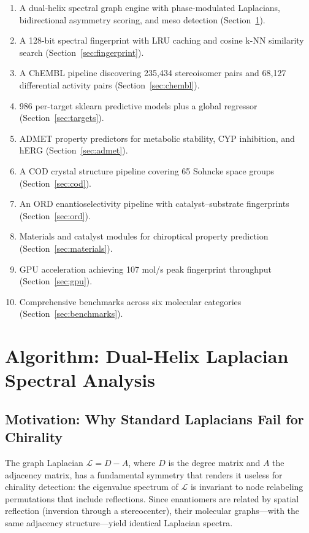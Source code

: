 \documentclass[11pt,a4paper]{article}
\begin{document}
\begin{enumerate}[leftmargin=1.5em]
  \item A dual-helix spectral graph engine with phase-modulated Laplacians,
    bidirectional asymmetry scoring, and meso detection (Section~\ref{sec:algorithm}).
  \item A 128-bit spectral fingerprint with LRU caching and cosine k-NN similarity
    search (Section~\ref{sec:fingerprint}).
  \item A ChEMBL pipeline discovering 235,434 stereoisomer pairs and 68,127
    differential activity pairs (Section~\ref{sec:chembl}).
  \item 986 per-target sklearn predictive models plus a global regressor
    (Section~\ref{sec:targets}).
  \item ADMET property predictors for metabolic stability, CYP inhibition,
    and hERG (Section~\ref{sec:admet}).
  \item A COD crystal structure pipeline covering 65 Sohncke space groups
    (Section~\ref{sec:cod}).
  \item An ORD enantioselectivity pipeline with catalyst--substrate fingerprints
    (Section~\ref{sec:ord}).
  \item Materials and catalyst modules for chiroptical property prediction
    (Section~\ref{sec:materials}).
  \item GPU acceleration achieving 107 mol/s peak fingerprint throughput
    (Section~\ref{sec:gpu}).
  \item Comprehensive benchmarks across six molecular categories
    (Section~\ref{sec:benchmarks}).
\end{enumerate}

\newpage

\section{Algorithm: Dual-Helix Laplacian Spectral Analysis}
\label{sec:algorithm}

\subsection{Motivation: Why Standard Laplacians Fail for Chirality}

The graph Laplacian $\mathcal{L} = D - A$, where $D$ is the degree matrix and
$A$ the adjacency matrix, has a fundamental symmetry that renders it useless for
chirality detection: the eigenvalue spectrum of $\mathcal{L}$ is invariant to
node relabeling permutations that include reflections. Since enantiomers are
related by spatial reflection (inversion through a stereocenter), their molecular
graphs---with the same adjacency structure---yield identical Laplacian spectra.
\end{document}
